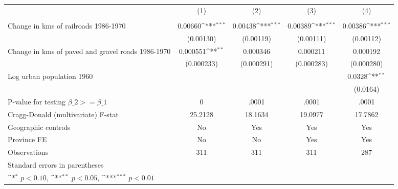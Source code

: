 {
\def\sym#1{\ifmmode^{#1}\else\(^{#1}\)\fi}
\begin{tabular}{l*{4}{c}}
\hline\hline
                &\multicolumn{1}{c}{(1)}&\multicolumn{1}{c}{(2)}&\multicolumn{1}{c}{(3)}&\multicolumn{1}{c}{(4)}\\
                &\multicolumn{1}{c}{}&\multicolumn{1}{c}{}&\multicolumn{1}{c}{}&\multicolumn{1}{c}{}\\
\hline
Change in kms of railroads 1986-1970&  0.00660\sym{***}&  0.00438\sym{***}&  0.00389\sym{***}&  0.00386\sym{***}\\
                &(0.00130)         &(0.00119)         &(0.00111)         &(0.00112)         \\
[1em]
Change in kms of paved and gravel roads 1986-1970& 0.000551\sym{**} & 0.000346         & 0.000211         & 0.000192         \\
                &(0.000233)         &(0.000291)         &(0.000283)         &(0.000280)         \\
[1em]
Log urban population 1960&                  &                  &                  &   0.0328\sym{**} \\
                &                  &                  &                  & (0.0164)         \\
\hline
P-value for testing $\beta\_{2} >= \beta\_{1}$&        0         &    .0001         &    .0001         &    .0001         \\
Cragg-Donald (multivariate) F-stat&  25.2128         &  18.1634         &  19.0977         &  17.7862         \\
Geographic controls&       No         &      Yes         &      Yes         &      Yes         \\
Province FE     &       No         &       No         &      Yes         &      Yes         \\
Observations    &      311         &      311         &      311         &      287         \\
\hline\hline
\multicolumn{5}{l}{\footnotesize Standard errors in parentheses}\\
\multicolumn{5}{l}{\footnotesize \sym{*} \(p<0.10\), \sym{**} \(p<0.05\), \sym{***} \(p<0.01\)}\\
\end{tabular}
}
